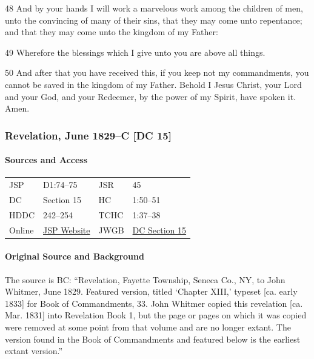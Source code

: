 				48 And by your hands I will work a marvelous work among the children of men, unto the convincing of many of their sins, that they may come unto repentance; and that they may come unto the kingdom of my Father:

				49 Wherefore the blessings which I give unto you are above all things.

				50 And after that you have received this, if you keep not my commandments, you cannot be saved in the kingdom of my Father. Behold I Jesus Christ, your Lord and your God, and your Redeemer, by the power of my Spirit, have spoken it. Amen.
			
		\subsubsection{Revelation, June 1829--C [DC 15]}
			\label{EMS-1828-1829-JS-JUN-1829-C}
			
			\paragraph{Sources and Access}

				\begin{tabular}{p{1in}p{1.5in}p{1in}p{1.5in}}
				JSP	 	& D1:74--75		& JSR 		& 45		 \\  
				DC	 	& Section 15 	& HC 		& 1:50--51	 \\
				HDDC 	& 242--254 		& TCHC 		& 1:37--38	 \\
				Online  & \href{https://www.josephsmithpapers.org/paper-summary/revelation-june-1829-c-dc-15/1}{JSP Website} & 
				JWGB	& \hyperref[DC15]{DC Section 15} \\
				\end{tabular}
			
			\paragraph{Original Source and Background}
			
				The source is BC: ``Revelation, Fayette Township, Seneca Co., NY, to John Whitmer, June 1829. Featured version, titled `Chapter XIII,' typeset [ca. early 1833] for Book of Commandments, 33. John Whitmer copied this revelation [ca. Mar. 1831] into Revelation Book 1, but the page or pages on which it was copied were removed at some point from that volume and are no longer extant. The version found in the Book of Commandments and featured below is the earliest extant version.''
				
